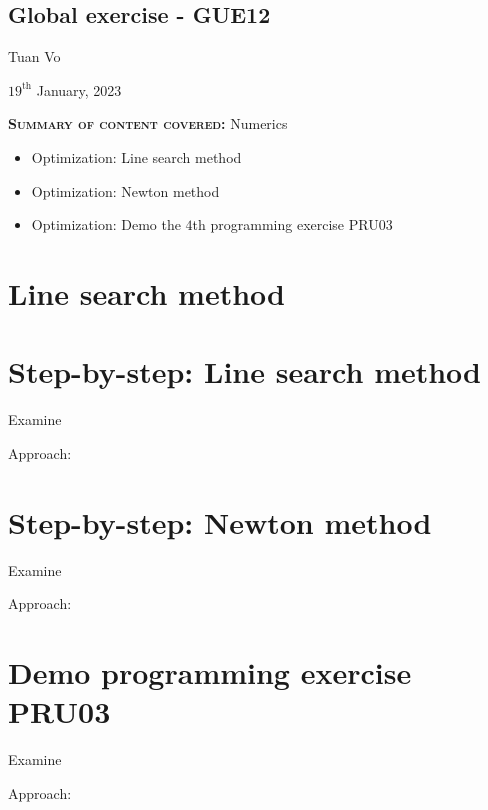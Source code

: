 \documentclass[12pt]{article}
\begin{document}
\begin{center}
	\section*{Global exercise - GUE12}
\end{center}
\begin{center}
	Tuan Vo
\end{center}
\begin{center}
	$19^{\text{th}}$ January, 2023
\end{center}
\textbf{\textsc{Summary of content covered:}} Numerics
\begin{itemize}
	\item[\checkmark] Optimization: Line search method
	\item[\checkmark] Optimization: Newton method
	\item[\checkmark] Optimization: Demo the $4$th programming exercise PRU03
\end{itemize}
\section{Line search method}

\clearpage
\section{Step-by-step: Line search method}
\begin{exampleboxed}
	Examine
\end{exampleboxed}
Approach:\\

\clearpage
\section{Step-by-step: Newton method}
\begin{exampleboxed}
	Examine
\end{exampleboxed}
Approach:\\

\clearpage
\section{Demo programming exercise PRU03}
\begin{exampleboxed}
	Examine
\end{exampleboxed}
Approach:\\



% 
\end{document}
